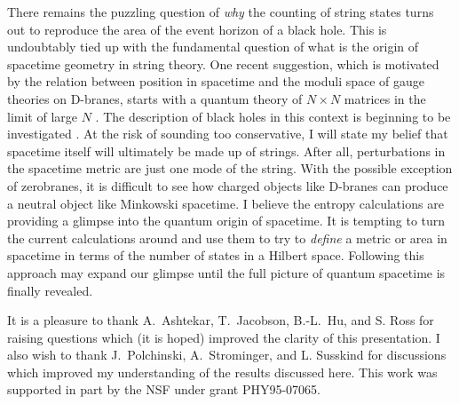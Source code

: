 There remains the puzzling question of {\it why} the counting of string states
turns out to reproduce the area of the event horizon of a black hole.
This is undoubtably tied up with the fundamental question of
what is the origin of spacetime geometry in string theory. One recent 
suggestion, which is motivated by the relation between position in spacetime
and the moduli space of gauge theories on D-branes, 
starts with a quantum theory of $N\times N$ matrices in the limit of large $N$
\cite{bfss}. The description of black holes in this context is beginning
to be investigated \cite{lima,dvv}. At the risk of sounding too
conservative, I will state my belief that 
spacetime itself will ultimately be made up
of strings. 
After all, perturbations in the spacetime metric are just one
mode of the string. With the possible exception of zerobranes, it is difficult
to see how charged objects like D-branes can produce a neutral object like
Minkowski spacetime.
I believe the entropy calculations are providing a
glimpse into the quantum origin of spacetime. It is tempting to turn
the current calculations around and use them to try to {\it define} a metric or
area in spacetime in terms of the number of states in a Hilbert space.
Following this approach may expand our glimpse 
until
the full picture of quantum spacetime is finally revealed.


It is a pleasure to thank A.~Ashtekar, T.~Jacobson, B.-L.~Hu, and S. Ross
for raising questions which (it is hoped) improved the clarity of this
presentation.  I also wish to thank J.~Polchinski, A.~Strominger, and 
L. Susskind for
discussions which improved my understanding of the results discussed
here.  This work was
supported in part by the NSF under grant PHY95-07065.



